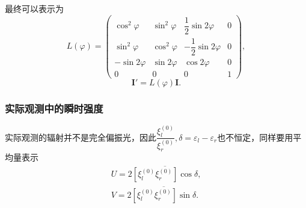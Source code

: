 \documentclass[../天体物理基础.tex]{subfiles}
\begin{document}
最终可以表示为
\begin{equation}
L(\varphi)=\begin{pmatrix}
\cos^2\varphi &\sin^2\varphi &\dfrac12\sin2\varphi & 0\\
\sin^2\varphi &\cos^2\varphi & -\dfrac12\sin2\varphi & 0\\
-\sin2\varphi &\sin2\varphi &\cos2\varphi & 0\\
0 & 0 & 0 & 1
\end{pmatrix},
\end{equation}
\begin{equation}
\boldsymbol I'=L\left(\varphi\right)\boldsymbol I.
\end{equation}

\subsubsection{实际观测中的瞬时强度}
实际观测的辐射并不是完全偏振光，因此$\dfrac{\xi_l^{\left(0\right)}}{\xi_r^{\left(0\right)}},\delta=\varepsilon_l-\varepsilon_r$也不恒定，同样要用平均量表示
\begin{align}
U=2\overline{\left[\xi_l^{\left(0\right)}\xi_r^{\left(0\right)}\right]\cos\delta},\\
V=2\overline{\left[\xi_l^{\left(0\right)}\xi_r^{\left(0\right)}\right]\sin\delta}.
\end{align}
\end{document}
